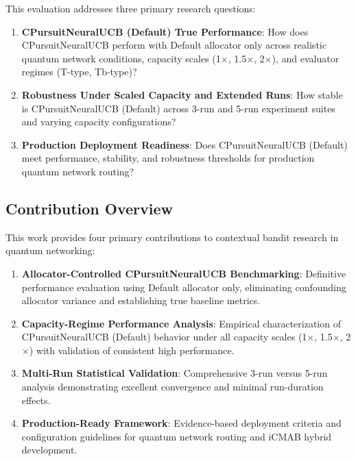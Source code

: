 \documentclass[12pt,a4paper]{article}
\begin{document}
This evaluation addresses three primary research questions:

\begin{enumerate}
\item \textbf{CPursuitNeuralUCB (Default) True Performance}: How does CPursuitNeuralUCB perform with Default allocator only across realistic quantum network conditions, capacity scales (1$\times$, 1.5$\times$, 2$\times$), and evaluator regimes (T-type, Tb-type)?

\item \textbf{Robustness Under Scaled Capacity and Extended Runs}: How stable is CPursuitNeuralUCB (Default) across 3-run and 5-run experiment suites and varying capacity configurations?

\item \textbf{Production Deployment Readiness}: Does CPursuitNeuralUCB (Default) meet performance, stability, and robustness thresholds for production quantum network routing?
\end{enumerate}

\subsection{Contribution Overview}

This work provides four primary contributions to contextual bandit research in quantum networking:

\begin{enumerate}
\item \textbf{Allocator-Controlled CPursuitNeuralUCB Benchmarking}: Definitive performance evaluation using Default allocator only, eliminating confounding allocator variance and establishing true baseline metrics.

\item \textbf{Capacity-Regime Performance Analysis}: Empirical characterization of CPursuitNeuralUCB (Default) behavior under all capacity scales (1$\times$, 1.5$\times$, 2$\times$) with validation of consistent high performance.

\item \textbf{Multi-Run Statistical Validation}: Comprehensive 3-run versus 5-run analysis demonstrating excellent convergence and minimal run-duration effects.

\item \textbf{Production-Ready Framework}: Evidence-based deployment criteria and configuration guidelines for quantum network routing and iCMAB hybrid development.
\end{enumerate}
\end{document}
